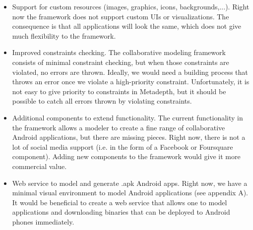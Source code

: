 \begin{itemize}
\item{Support for custom resources (images, graphics, icons, backgrounds,...). Right now the framework does not support custom UIs or visualizations. The consequence is that all applications will look the same, which does not give much flexibility to the framework.}
\item{Improved constraints checking. The collaborative modeling framework consists of minimal constraint checking, but when those constraints are violated, no errors are thrown. Ideally, we would need a building process that throws an error once we violate a high-priority constraint. Unfortunately, it is not easy to give priority to constraints in Metadepth, but it should be possible to catch all errors thrown by violating constraints.}
\item{Additional components to extend functionality. The current functionality in the framework allows a modeler to create a fine range of collaborative Android applications, but there are missing pieces. Right now, there is not a lot of social media support (i.e. in the form of a Facebook or Foursquare component). Adding new components to the framework would give it more commercial value.}
\item{Web service to model and generate .apk Android apps. Right now, we have a minimal visual environment to model Android applications (see appendix A). It would be beneficial to create a web service that allows one to model applications and downloading binaries that can be deployed to Android phones immediately.}
\end{itemize}
